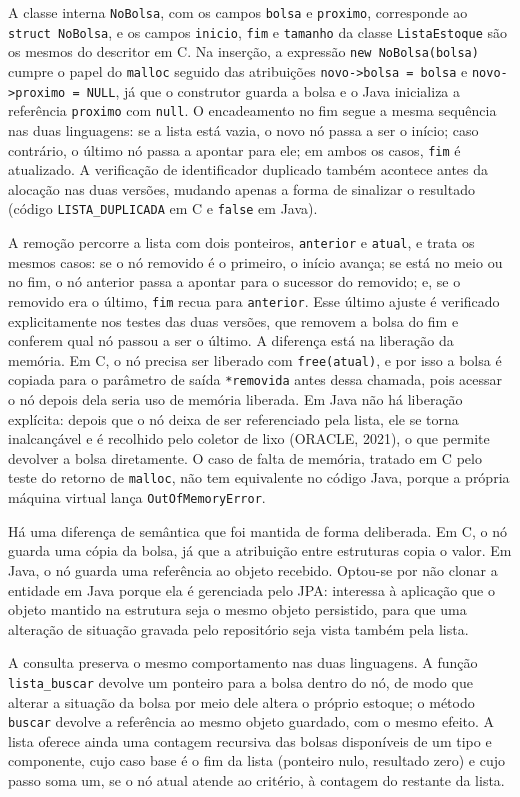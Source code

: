 \documentclass[12pt,a4paper,oneside]{report}
\newcommand{\cod}[1]{\texttt{#1}}
\begin{document}
A classe interna \cod{NoBolsa}, com os campos \cod{bolsa} e \cod{proximo}, corresponde ao \cod{struct NoBolsa}, e os campos \cod{inicio}, \cod{fim} e \cod{tamanho} da classe \cod{ListaEstoque} são os mesmos do descritor em C. Na inserção, a expressão \cod{new NoBolsa(bolsa)} cumpre o papel do \cod{malloc} seguido das atribuições \cod{novo->bolsa = bolsa} e \cod{novo->proximo = NULL}, já que o construtor guarda a bolsa e o Java inicializa a referência \cod{proximo} com \cod{null}. O encadeamento no fim segue a mesma sequência nas duas linguagens: se a lista está vazia, o novo nó passa a ser o início; caso contrário, o último nó passa a apontar para ele; em ambos os casos, \cod{fim} é atualizado. A verificação de identificador duplicado também acontece antes da alocação nas duas versões, mudando apenas a forma de sinalizar o resultado (código \cod{LISTA\_DUPLICADA} em C e \cod{false} em Java).

A remoção percorre a lista com dois ponteiros, \cod{anterior} e \cod{atual}, e trata os mesmos casos: se o nó removido é o primeiro, o início avança; se está no meio ou no fim, o nó anterior passa a apontar para o sucessor do removido; e, se o removido era o último, \cod{fim} recua para \cod{anterior}. Esse último ajuste é verificado explicitamente nos testes das duas versões, que removem a bolsa do fim e conferem qual nó passou a ser o último. A diferença está na liberação da memória. Em C, o nó precisa ser liberado com \cod{free(atual)}, e por isso a bolsa é copiada para o parâmetro de saída \cod{*removida} antes dessa chamada, pois acessar o nó depois dela seria uso de memória liberada. Em Java não há liberação explícita: depois que o nó deixa de ser referenciado pela lista, ele se torna inalcançável e é recolhido pelo coletor de lixo (ORACLE, 2021), o que permite devolver a bolsa diretamente. O caso de falta de memória, tratado em C pelo teste do retorno de \cod{malloc}, não tem equivalente no código Java, porque a própria máquina virtual lança \cod{OutOfMemoryError}.

Há uma diferença de semântica que foi mantida de forma deliberada. Em C, o nó guarda uma cópia da bolsa, já que a atribuição entre estruturas copia o valor. Em Java, o nó guarda uma referência ao objeto recebido. Optou-se por não clonar a entidade em Java porque ela é gerenciada pelo JPA: interessa à aplicação que o objeto mantido na estrutura seja o mesmo objeto persistido, para que uma alteração de situação gravada pelo repositório seja vista também pela lista.

A consulta preserva o mesmo comportamento nas duas linguagens. A função \cod{lista\_buscar} devolve um ponteiro para a bolsa dentro do nó, de modo que alterar a situação da bolsa por meio dele altera o próprio estoque; o método \cod{buscar} devolve a referência ao mesmo objeto guardado, com o mesmo efeito. A lista oferece ainda uma contagem recursiva das bolsas disponíveis de um tipo e componente, cujo caso base é o fim da lista (ponteiro nulo, resultado zero) e cujo passo soma um, se o nó atual atende ao critério, à contagem do restante da lista.
\end{document}
